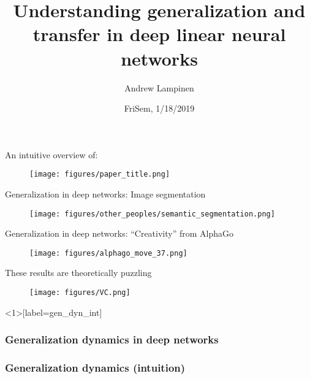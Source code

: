 \documentclass{beamer}
\begin{document}
\title{Understanding generalization and transfer in deep linear neural networks}
\author{Andrew Lampinen}
\date{FriSem, 1/18/2019}
\frame{\titlepage}

\begin{frame}{An intuitive overview of:}
\begin{figure}
\texttt{[image: figures/paper\_title.png]}
\end{figure}
\end{frame}

\begin{frame}{Generalization in deep networks: Image segmentation}
\begin{figure}
\texttt{[image: figures/other\_peoples/semantic\_segmentation.png]}
\end{figure}
\end{frame}

\begin{frame}{Generalization in deep networks: ``Creativity'' from AlphaGo}
\begin{figure}
\texttt{[image: figures/alphago\_move\_37.png]}
\end{figure}
\end{frame}

\begin{frame}{These results are theoretically puzzling}
\begin{figure}
\texttt{[image: figures/VC.png]}
\end{figure}
\end{frame}

\begin{frame}<1>[label=gen_dyn_int]
\frametitle<1>{Generalization dynamics in deep networks}

\frametitle<2->{Generalization dynamics (intuition)}
\begin{figure}
\end{figure}
\end{frame}
\end{document}
